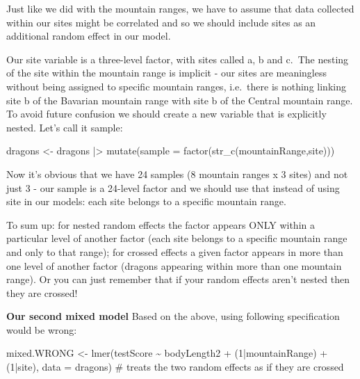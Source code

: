 \documentclass[
  letterpaper,
  DIV=11,
  numbers=noendperiod]{scrreprt}
\newenvironment{Shaded}{\begin{snugshade}}{\end{snugshade}}
\newcommand{\AttributeTok}[1]{\textcolor[rgb]{0.40,0.45,0.13}{#1}}
\newcommand{\CommentTok}[1]{\textcolor[rgb]{0.37,0.37,0.37}{#1}}
\newcommand{\DecValTok}[1]{\textcolor[rgb]{0.68,0.00,0.00}{#1}}
\newcommand{\FunctionTok}[1]{\textcolor[rgb]{0.28,0.35,0.67}{#1}}
\newcommand{\NormalTok}[1]{\textcolor[rgb]{0.00,0.23,0.31}{#1}}
\newcommand{\OtherTok}[1]{\textcolor[rgb]{0.00,0.23,0.31}{#1}}
\newcommand{\SpecialCharTok}[1]{\textcolor[rgb]{0.37,0.37,0.37}{#1}}
\begin{document}
Just like we did with the mountain ranges, we have to assume that data
collected within our sites might be correlated and so we should include
sites as an additional random effect in our model.

Our site variable is a three-level factor, with sites called a, b and
c.~The nesting of the site within the mountain range is implicit - our
sites are meaningless without being assigned to specific mountain
ranges, i.e.~there is nothing linking site b of the Bavarian mountain
range with site b of the Central mountain range. To avoid future
confusion we should create a new variable that is explicitly nested.
Let's call it sample:

\begin{Shaded}
\begin{Highlighting}[]
\NormalTok{dragons }\OtherTok{\textless{}{-}}\NormalTok{ dragons }\SpecialCharTok{|\textgreater{}}
  \FunctionTok{mutate}\NormalTok{(}\AttributeTok{sample =} \FunctionTok{factor}\NormalTok{(}\FunctionTok{str\_c}\NormalTok{(mountainRange,site)))}
\end{Highlighting}
\end{Shaded}

Now it's obvious that we have 24 samples (8 mountain ranges x 3 sites)
and not just 3 - our sample is a 24-level factor and we should use that
instead of using site in our models: each site belongs to a specific
mountain range.

To sum up: for nested random effects the factor appears ONLY within a
particular level of another factor (each site belongs to a specific
mountain range and only to that range); for crossed effects a given
factor appears in more than one level of another factor (dragons
appearing within more than one mountain range). Or you can just remember
that if your random effects aren't nested then they are crossed!

\textbf{Our second mixed model} Based on the above, using following
specification would be wrong:

\begin{Shaded}
\begin{Highlighting}[]
\NormalTok{mixed.WRONG }\OtherTok{\textless{}{-}} \FunctionTok{lmer}\NormalTok{(testScore }\SpecialCharTok{\textasciitilde{}}\NormalTok{ bodyLength2 }\SpecialCharTok{+}\NormalTok{ (}\DecValTok{1}\SpecialCharTok{|}\NormalTok{mountainRange) }\SpecialCharTok{+}\NormalTok{ (}\DecValTok{1}\SpecialCharTok{|}\NormalTok{site), }\AttributeTok{data =}\NormalTok{ dragons)  }\CommentTok{\# treats the two random effects as if they are crossed}
\end{Highlighting}
\end{Shaded}
\end{document}
